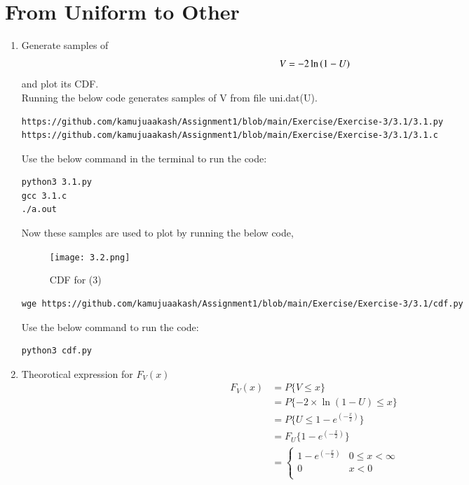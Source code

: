 \documentclass[journal,12pt,twocolumn]{IEEEtran}
\renewcommand\thesection{\arabic{section}}
\begin{document}
\section{From Uniform to Other}
\begin{enumerate}[label=\thesection.\arabic*,ref=\thesection.\theenumi]
\item
Generate samples of 
%
\begin{equation}
V = -2\ln\left(1-U\right)
\end{equation}
%
and plot its CDF.\\ 
\solution
Running the below code generates samples of V from file uni.dat(U).
\begin{lstlisting}
https://github.com/kamujuaakash/Assignment1/blob/main/Exercise/Exercise-3/3.1/3.1.py
https://github.com/kamujuaakash/Assignment1/blob/main/Exercise/Exercise-3/3.1/3.1.c
\end{lstlisting}
Use the below command in the terminal to run the code:
\begin{lstlisting}
python3 3.1.py
gcc 3.1.c
./a.out
\end{lstlisting}
Now these samples are used to plot  by running the below code,
 \begin{figure}[!h]
\texttt{[image: 3.2.png]}
\caption{CDF for (3)}
\label{fig:V}
\end{figure}
\begin{lstlisting}
wge https://github.com/kamujuaakash/Assignment1/blob/main/Exercise/Exercise-3/3.1/cdf.py
\end{lstlisting}
Use the below command to run the code:
\begin{lstlisting}
python3 cdf.py
\end{lstlisting}
\item
Theorotical expression for $F_V (x)$
\begin{align*}
    F_V (x) &= P\{V \le x\} \\
            &= P\{-2\times \ln{(1-U)} \le x\} \\
            &= P\{U \le 1 - e^{(-\frac{x}{2})}\} \\ 
            &= F_U\{1- e^{(-\frac{x}{2})} \}\\
            &=
\begin{cases}
 1 - e^{(-\frac{x}{2})} & 0 \le x < \infty \\
 0  & x<0 \\
 \end{cases}
\end{align*} 
\end{enumerate}
\end{document}
